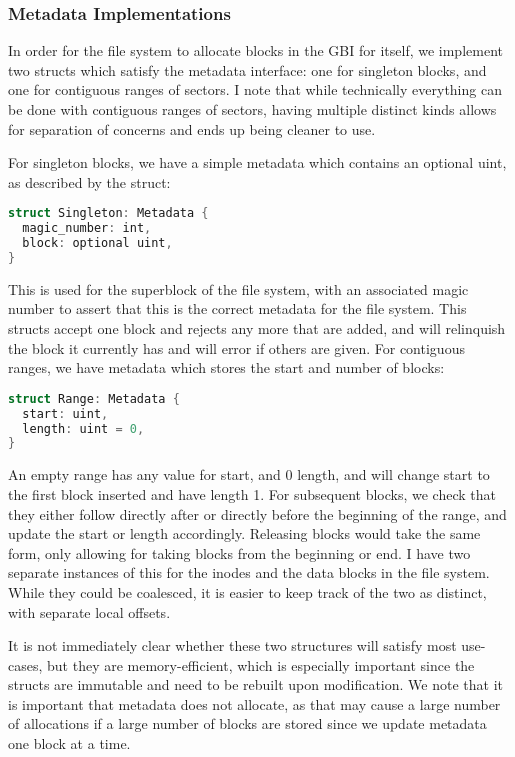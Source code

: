 \documentclass[letterpaper,twocolumn,10pt]{article}
\begin{document}
\subsubsection{Metadata Implementations}

In order for the file system to allocate blocks in the GBI for itself, we implement two structs
which satisfy the metadata interface: one for singleton blocks, and one for contiguous ranges of
sectors. I note that while technically everything can be done with contiguous ranges of sectors,
having multiple distinct kinds allows for separation of concerns and ends up being cleaner to
use.

For singleton blocks, we have a simple metadata which contains an optional uint, as
described by the struct:
\begin{lstlisting}[language=rust, basicstyle=\small]
struct Singleton: Metadata {
  magic_number: int,
  block: optional uint,
}
\end{lstlisting}

This is used for the superblock of the file system, with an associated magic number to assert
that this is the correct metadata for the file system. This structs accept one block and rejects
any more that are added, and will relinquish the block it currently has and will error if others
are given.
For contiguous ranges, we have metadata which stores the start and number of blocks:
\begin{lstlisting}[language=rust, basicstyle=\small]
struct Range: Metadata {
  start: uint,
  length: uint = 0,
}
\end{lstlisting}

An empty range has any value for start, and 0 length, and will change start to the first block
inserted and have length 1. For subsequent blocks, we check that they either follow directly
after or directly before the beginning of the range, and update the start or length accordingly.
Releasing blocks would take the same form, only allowing for taking blocks from the beginning or
end. I have two separate instances of this for the inodes and the data blocks in the file system.
While they could be coalesced, it is easier to keep track of the two as distinct, with separate
local offsets.

It is not immediately clear whether these two structures will satisfy most use-cases, but they
are memory-efficient, which is especially important since the structs are immutable and need to
be rebuilt upon modification. We note that it is important that metadata does not allocate,  as
that may cause a large number of allocations if a large number of blocks are stored since we
update metadata one block at a time.
\end{document}
